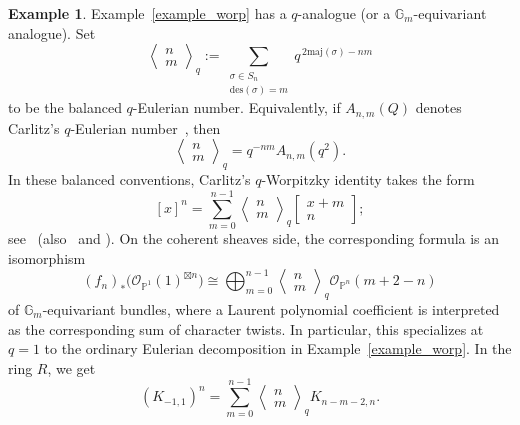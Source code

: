 \documentclass{article}
\newcommand{\mcO}{\mathcal{O}}
\newcommand{\PP}{\mathbb{P}}
\newcommand{\bbinom}[2]{
  \begin{bmatrix}
    #1 \\
    #2
  \end{bmatrix}
}
\theoremstyle{definition}
\newtheorem{example}[thm]{Example}
\theoremstyle{definition}
\begin{document}
\begin{example} Example~\ref{example_worp} has a $q$-analogue (or a  $\mathbb G_m$-equivariant analogue).  Set
\[
\left\langle \begin{matrix} n \\ m \end{matrix}\right\rangle_q
:=
\sum_{\substack{\sigma\in S_n\\ \mathrm{des}(\sigma)=m}}
q^{\,2\mathrm{maj}(\sigma)-nm}
\]
to be the balanced $q$-Eulerian number.  Equivalently, if $A_{n,m}(Q)$ denotes
Carlitz's $q$-Eulerian number~\cite{Carlitz}, then
\[
\left\langle \begin{matrix} n \\ m \end{matrix}\right\rangle_q
=q^{-nm}A_{n,m}(q^2).
\]
In these balanced conventions, Carlitz's $q$-Worpitzky identity takes the form
\begin{equation}\label{eq_worpit_q}
[x]^n
=
\sum_{m=0}^{n-1}
\left\langle \begin{matrix} n \\ m \end{matrix}\right\rangle_q
\bbinom{x+m}{n};
\end{equation}
see~\cite{Carlitz} (also~\cite{Carlitz2} and \cite[Chapter 6.5]{Pet}).  On the coherent sheaves side, the corresponding formula is an isomorphism
\[
(f_n)_*\bigl(\mcO_{\PP^1}(1)^{\boxtimes n}\bigr)
\cong
\bigoplus_{m=0}^{n-1}
\left\langle \begin{matrix} n \\ m \end{matrix}\right\rangle_q
\mcO_{\PP^n}(m+2-n)
\]
of $\mathbb G_m$-equivariant bundles, where a Laurent polynomial coefficient
is interpreted as the corresponding sum of character twists.  In particular,
this specializes at $q=1$ to the ordinary Eulerian decomposition in Example~\ref{example_worp}. In the ring $R$, we get
\[
(K_{-1,1})^n = \sum_{m=0}^{n-1}\left\langle \begin{matrix} n \\ m \end{matrix}\right\rangle_q K_{n-m-2,n}.
\]
\end{example}
\end{document}
